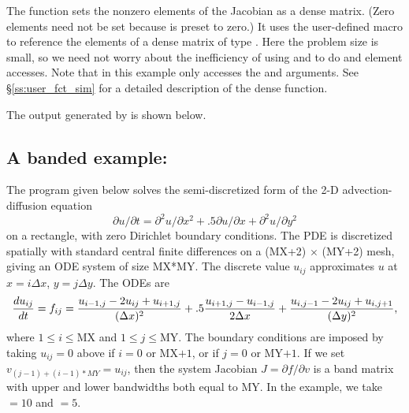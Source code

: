 The function  sets the nonzero elements of the Jacobian
as a dense matrix.  (Zero elements need not be set because 
is preset to zero.)  It uses the user-defined macro
to reference the elements of a dense matrix of type .
Here the problem size is small, so we need not worry about the
inefficiency of using  and  to do
 and  element accesses.
Note that in this example  only accesses the  and  arguments.
See \S\ref{ss:user_fct_sim} for a detailed description of the dense  function.

The output generated by  is shown below.


\subsection{A banded example: }\label{ss:cvbx}

The  program given below solves the semi-discretized form
of the 2-D advection-diffusion equation
\begin{equation}
\label{eq:adeqn}
\partial u / \partial t = \partial^2 u / \partial x^2
  + .5 \partial u / \partial x + \partial^2 u / \partial y^2
\end{equation}
on a rectangle, with zero Dirichlet boundary conditions. The PDE is 
discretized spatially with standard central finite differences 
on a (MX+2) $\times$ (MY+2) mesh, giving an ODE system of size MX*MY.  
The discrete value $u_{ij}$ approximates $u$ at $x = i \Delta x$,
$y = j \Delta y$. The ODEs are
\begin{equation}
\label{eq:cdiff}
{{du_{ij}} \over dt} = f_{ij} =
         {{u_{i-1,j} - 2 u_{ij} + u_{i+1,j}} \over {(\Delta x)^2}}
       + .5  {{u_{i+1,j} - u_{i-1,j}} \over {2 \Delta x}}
       + {{u_{i,j-1} - 2 u_{ij} + u_{i,j+1}} \over {(\Delta y)^2}},
\end{equation}
where $1 \leq i \leq $MX and $1 \leq j \leq $MY.  The boundary
conditions are imposed by taking $u_{ij} = 0$ above if $i = 0$
or MX$+1$, or if $j = 0$ or MY$+1$. 
If we set $v_{(j-1)+(i-1)*MY} = u_{ij}$, then the system Jacobian
$J = \partial f / \partial v$ is a band matrix with upper and lower
bandwidths both equal to MY.  In the example, we take  $= 10$ and
 $= 5$.

